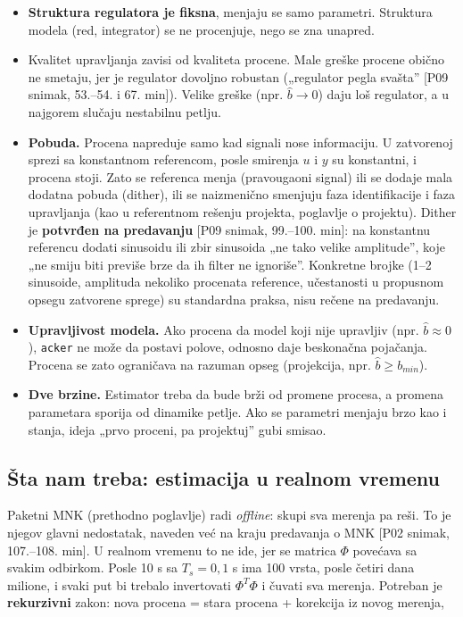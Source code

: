 \documentclass[11pt,a4paper,parskip=half,headsepline,numbers=noenddot]{scrartcl}
\DeclareRobustCommand{\izvor}[1]{{\small\color{izvorC}[#1]}}
\begin{document}
\begin{itemize}
\item \textbf{Struktura regulatora je fiksna}, menjaju se samo parametri. Struktura modela (red, integrator) se ne procenjuje, nego se zna unapred.
\item Kvalitet upravljanja zavisi od kvaliteta procene. Male greške procene obično ne smetaju, jer je regulator dovoljno robustan („regulator pegla svašta'' \izvor{P09 snimak, 53.--54. i 67. min}). Velike greške (npr. \(\hat b \to 0\)) daju loš regulator, a u najgorem slučaju nestabilnu petlju.
\item \textbf{Pobuda.} Procena napreduje samo kad signali nose informaciju. U zatvorenoj sprezi sa konstantnom referencom, posle smirenja \(u\) i \(y\) su konstantni, i procena stoji. Zato se referenca menja (pravougaoni signal) ili se dodaje mala dodatna pobuda (dither), ili se naizmenično smenjuju faza identifikacije i faza upravljanja (kao u referentnom rešenju projekta, poglavlje o projektu). Dither je \textbf{potvrđen na predavanju} \izvor{P09 snimak, 99.--100. min}: na konstantnu referencu dodati sinusoidu ili zbir sinusoida „ne tako velike amplitude'', koje „ne smiju biti previše brze da ih filter ne ignoriše''. Konkretne brojke (1--2 sinusoide, amplituda nekoliko procenata reference, učestanosti u propusnom opsegu zatvorene sprege) su standardna praksa, nisu rečene na predavanju.
\item \textbf{Upravljivost modela.} Ako procena da model koji nije upravljiv (npr. \(\hat b \approx 0\)), \texttt{acker} ne može da postavi polove, odnosno daje beskonačna pojačanja. Procena se zato ograničava na razuman opseg (projekcija, npr. \(\hat b \ge b_{min}\)).
\item \textbf{Dve brzine.} Estimator treba da bude brži od promene procesa, a promena parametara sporija od dinamike petlje. Ako se parametri menjaju brzo kao i stanja, ideja „prvo proceni, pa projektuj'' gubi smisao.
\end{itemize}

\subsection{Šta nam treba: estimacija u realnom vremenu}

Paketni MNK (prethodno poglavlje) radi \emph{offline}: skupi sva merenja pa reši. To je njegov glavni nedostatak, naveden već na kraju predavanja o MNK \izvor{P02 snimak, 107.--108. min}. U realnom vremenu to ne ide, jer se matrica \(\Phi\) povećava sa svakim odbirkom. Posle 10 s sa \(T_s = 0{,}1\) s ima 100 vrsta, posle četiri dana milione, i svaki put bi trebalo invertovati \(\Phi^T\Phi\) i čuvati sva merenja. Potreban je \textbf{rekurzivni} zakon: nova procena = stara procena + korekcija iz novog merenja,
\end{document}
